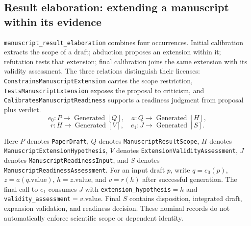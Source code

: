 \subsection{Result elaboration: extending a manuscript within its evidence}
\label{app:granular-manuscript_result_elaboration}
\texttt{manuscript\_result\_elaboration} combines four occurrences. Initial calibration extracts the scope of a draft; abduction proposes an extension within it; refutation tests that extension; final calibration joins the same extension with its validity assessment. The three relations distinguish their licenses: \texttt{Constrains\allowbreak Manuscript\allowbreak Extension} carries the scope restriction, \texttt{Tests\allowbreak Manuscript\allowbreak Extension} exposes the proposal to criticism, and \texttt{Calibrates\allowbreak Manuscript\allowbreak Readiness} supports a readiness judgment from proposal plus verdict.
\[
 e_0:P\to\operatorname{Generated}[Q],\quad a:Q\to\operatorname{Generated}[H],
\]
\[
 r:H\to\operatorname{Generated}[V],\quad e_1:J\to\operatorname{Generated}[S].
\]
\begingroup\raggedright
Here $P$ denotes \texttt{Paper\allowbreak Draft}, $Q$ denotes \texttt{Manuscript\allowbreak Result\allowbreak Scope}, $H$ denotes \texttt{Manuscript\allowbreak Extension\allowbreak Hypothesis}, $V$ denotes \texttt{Extension\allowbreak Validity\allowbreak Assessment}, $J$ denotes \texttt{Manuscript\allowbreak Readiness\allowbreak Input}, and $S$ denotes \texttt{Manuscript\allowbreak Readiness\allowbreak Assessment}. For an input draft $p$, write $q=e_0(p)$, $z=a(q.\mathrm{value})$, $h=z.\mathrm{value}$, and $v=r(h)$ after successful generation. The final call to $e_1$ consumes $J$ with \texttt{extension\_hypothesis}$=h$ and \texttt{validity\_assessment}$=v.\mathrm{value}$. Final $S$ contains disposition, integrated draft, expansion validation, and readiness decision. These nominal records do not automatically enforce scientific scope or dependent identity.\par\endgroup

